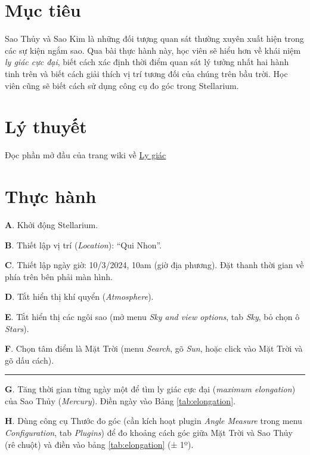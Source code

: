 \documentclass[
]{book}
\begin{document}
\section{Mục tiêu}\label{mux1ee5c-tiuxeau-1}

Sao Thủy và Sao Kim là những đối tượng quan sát thường xuyên xuất hiện trong các sự kiện ngắm sao. Qua bài thực hành này, học viên sẽ hiểu hơn về khái niệm \emph{ly giác cực đại}, biết cách xác định thời điểm quan sát lý tưởng nhất hai hành tinh trên và biết cách giải thích vị trí tương đối của chúng trên bầu trời. Học viên cũng sẽ biết cách sử dụng công cụ đo góc trong Stellarium.

\section{Lý thuyết}\label{luxfd-thuyux1ebft-1}

Đọc phần mở đầu của trang wiki về \href{https://vi.wikipedia.org/wiki/Ly_gi\%C3\%A1c_(thi\%C3\%AAn_v\%C4\%83n_h\%E1\%BB\%8Dc)}{Ly giác}

\section{Thực hành}\label{thux1ef1c-huxe0nh-1}

\textbf{A}. Khởi động Stellarium.

\textbf{B}. Thiết lập vị trí (\emph{Location}): ``Qui Nhon''.

\textbf{C}. Thiết lập ngày giờ: 10/3/2024, 10am (giờ địa phương). Đặt thanh thời gian về phía trên bên phải màn hình.

\textbf{D}. Tắt hiển thị khí quyển (\emph{Atmosphere}).

\textbf{E}. Tắt hiển thị các ngôi sao (mở menu \emph{Sky and view options}, tab \emph{Sky}, bỏ chọn ô \emph{Stars}).

\textbf{F}. Chọn tâm điểm là Mặt Trời (menu \emph{Search}, gõ \emph{Sun}, hoặc click vào Mặt Trời và gõ dấu cách).

\begin{center}\rule{0.5\linewidth}{0.5pt}\end{center}

\textbf{G}. Tăng thời gian từng ngày một để tìm ly giác cực đại (\emph{maximum elongation}) của Sao Thủy (\emph{Mercury}). Điền ngày vào Bảng \ref{tab:elongation}.

\textbf{H}. Dùng công cụ Thước đo góc (cần kích hoạt plugin \emph{Angle Measure} trong menu \emph{Configuration}, tab \emph{Plugins}) để đo khoảng cách góc giữa Mặt Trời và Sao Thủy (rê chuột) và điền vào bảng \ref{tab:elongation} (± 1º).
\end{document}
